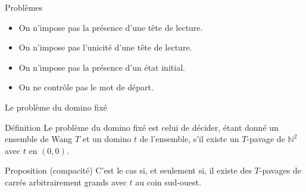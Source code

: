 \documentclass{beamer}
\newcommand{\N}{\mathbb N}
\begin{document}
\begin{frame}
\begin{figure}
            \label{fig:tilesidee}
          \end{figure}
    
    \end{frame}
    
    \begin{frame}
        
    \begin{alertblock}{Problèmes}
        \begin{itemize}
            \item On n'impose pas la présence d'une tête de lecture.
            \item On n'impose pas l'unicité d'une tête de lecture.
            \item On n'impose pas la présence d'un état initial.
            \item On ne contrôle pas le mot de départ.
        \end{itemize}
    \end{alertblock}
    
    \end{frame}
    
    \begin{frame}{Le problème du domino fixé}
    
    \begin{alertblock}{Définition}
        Le problème du domino fixé est celui de décider, étant donné un ensemble de Wang $T$ et un domino $t$ de l'ensemble, s'il existe un $T$-pavage de $\N^2$ avec $t$ en $(0,0)$.
    \end{alertblock}
    
    \begin{block}{Proposition (compacité)}
        C'est le cas si, et seulement si, il existe des $T$-pavages de carrés arbitrairement grands avec $t$ au coin sud-ouest. 
    \end{block}
    
    \end{frame}
    
\end{document}
